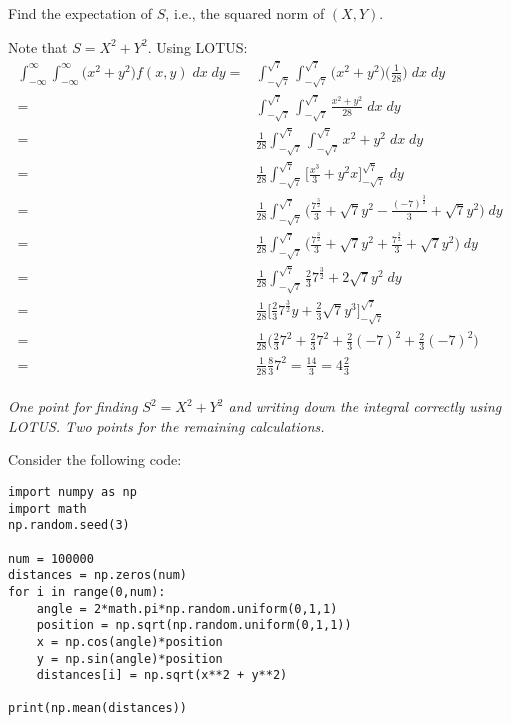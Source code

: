 \begin{exercise}[3]
Find the expectation of $S$, i.e., the squared norm of $(X,Y)$.
\begin{solution}
Note that $S = X^2 + Y^2$. Using LOTUS:
\begin{align*}
      \int_{-\infty}^\infty \int_{-\infty}^\infty \Big(x^2 + y^2 \Big) f(x,y) \; dx \; dy =& \int_{-\sqrt{7}}^{\sqrt{7}} \int_{-\sqrt{7}}^{\sqrt{7}}  \Big(x^2 + y^2 \Big) \Big(\frac{1}{28} \Big) \; dx \; dy \\
      =& \int_{-\sqrt{7}}^{\sqrt{7}} \int_{-\sqrt{7}}^{\sqrt{7}} \frac{x^2 + y^2}{28} \; dx \; dy \\
      =& \frac{1}{28} \int_{-\sqrt{7}}^{\sqrt{7}} \int_{-\sqrt{7}}^{\sqrt{7}} x^2 + y^2 \; dx \; dy \\
      =& \frac{1}{28} \int_{-\sqrt{7}}^{\sqrt{7}} \Big[\frac{x^3}{3} + y^2x \Big]_{-\sqrt{7}}^{\sqrt{7}} \; dy \\
      =& \frac{1}{28} \int_{-\sqrt{7}}^{\sqrt{7}} \Big( \frac{7^{\frac{3}{2}}}{3} + \sqrt{7}y^2 - \frac{(-7)^{\frac{3}{2}}}{3} + \sqrt{7}y^2 \Big)\; dy \\
        =& \frac{1}{28} \int_{-\sqrt{7}}^{\sqrt{7}} \Big( \frac{7^{\frac{3}{2}}}{3} + \sqrt{7}y^2 + \frac{7^{\frac{3}{2}}}{3} + \sqrt{7}y^2 \Big)\; dy \\
        =& \frac{1}{28} \int_{-\sqrt{7}}^{\sqrt{7}} \frac{2}{3} 7^{\frac{3}{2}} + 2\sqrt{7}y^2 \; dy \\
        =& \frac{1}{28} \Big[ \frac{2}{3} 7^{\frac{3}{2}}y + \frac{2}{3} \sqrt{7}y^3 \Big]_{-\sqrt{7}}^{\sqrt{7}}\\
        =& \frac{1}{28} \Big( \frac{2}{3} 7^2 + \frac{2}{3} 7^2 + \frac{2}{3} (-7)^2 + \frac{2}{3} (-7)^2 \Big) \\
        =& \frac{1}{28} \frac{8}{3} 7^2 = \frac{14}{3} = 4 \frac{2}{3}
\end{align*} \\
\textit{One point for finding $S^2 = X^2 + Y^2$ and writing down the integral correctly using LOTUS. Two points for the remaining calculations.}
\end{solution}
\end{exercise}
\noindent
Consider the following code:
\begin{verbatim}
import numpy as np
import math
np.random.seed(3)

num = 100000
distances = np.zeros(num)
for i in range(0,num):
    angle = 2*math.pi*np.random.uniform(0,1,1)
    position = np.sqrt(np.random.uniform(0,1,1))
    x = np.cos(angle)*position
    y = np.sin(angle)*position
    distances[i] = np.sqrt(x**2 + y**2)

print(np.mean(distances))
\end{verbatim}

